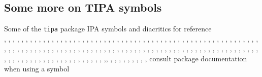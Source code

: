 \documentclass[11pt, letterpaper]{article}
\begin{document}
\subsection{Some more on TIPA symbols}
\pex Some of the \verb=tipa= package IPA symbols and diacritics for reference\\
\a \textbabygamma, \textglotstop, \textrtailn, \textbarb, \texthalflength, \textrtailr, \textbarc, \texthardsign, \textrtails, \textbard, \texthooktop, \textrtailt, \textbardotlessj, \texthtb, \textrtailz, \textbarg, \texthtbardotlessj, \textrthook, \textbarglotstop, \texthtc, \textsca, \textbari, \texthtd, \textscb, \textbarl, \texthtg, \textsce, \textbaro, \texthth, \textscg, \textbarrevglotstop, \texththeng, \textsch, \textbaru, \texthtk, \textschwa, \textbeltl, \texthtp, \textsci, \textbeta, \texthtq, \textscj, \textbullseye, \texthtrtaild, \textscl, \textceltpal, \texthtscg, \textscn, \textchi, \texthtt, \textscoelig, \textcloseepsilon, \texthvlig, \textscomega, \textcloseomega, \textinvglotstop, \textscr, \textcloserevepsilon, \textinvscr, \textscripta, \textcommatailz, \textiota, \textscriptg, \textcorner, \textlambda, \textscriptv, \textcrb, \textlengthmark, \textscu, \textcrd, \textlhookt, \textscy, \textcrg, \textlhtlongi, \textsecstress, \textcrh, \textlhtlongy, \textsoftsign, \textcrinvglotstop, \textlonglegr, \textstretchc, \textcrlambda, \textlptr, \texttctclig, \textcrtwo, \textltailm, \textteshlig, \textctc, \textltailn, \texttheta, \textctd, \textltilde, \textthorn, \textctdctzlig, \textlyoghlig, \texttoneletterstem, \textctesh, \textObardotlessj, \texttslig, \textctj, \textOlyoghlig, \textturna, \textctn, \textomega, \textturncelig, \textctt, \textopencorner, \textturnh, \textcttctclig, \textopeno, \textturnk, \textctyogh, \textpalhook, \textturnlonglegr, \textctz, \textphi, \textturnm, \textdctzlig, \textpipe, \textturnmrleg, \textdoublebaresh, \textprimstress, \textturnr, \textdoublebarpipe, \textraiseglotstop, \textturnrrtail, \textdoublebarslash, \textraisevibyi, \textturnscripta, \textdoublepipe, \textramshorns, \textturnt, \textdoublevertline, \textrevapostrophe, \textturnv, \textdownstep, \textreve, \textturnw, \textdyoghlig, \textrevepsilon, \textturny, \textdzlig ,\textrevglotstop, \textupsilon, \textepsilon, \textrevyogh, \textupstep, \textesh, \textrhookrevepsilon, \textvertline, \textfishhookr, \textrhookschwa, \textvibyi
\a consult package documentation when using a symbol
\xe
\end{document}
